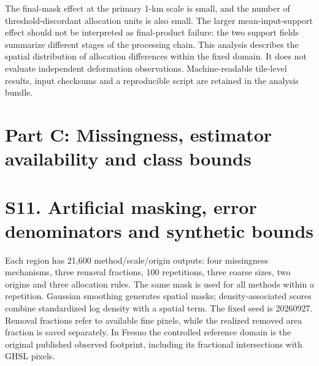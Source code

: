 \documentclass[10pt,a4paper]{article}
\begin{document}
The final-mask effect at the primary 1-km scale is small, and the number of threshold-discordant allocation units is also small. The larger mean-input-support effect should not be interpreted as final-product failure: the two support fields summarize different stages of the processing chain. This analysis describes the spatial distribution of allocation differences within the fixed domain. It does not evaluate independent deformation observations. Machine-readable tile-level results, input checksums and a reproducible script are retained in the analysis bundle.





\section*{Part C: Missingness, estimator availability and class bounds}
\section*{S11. Artificial masking, error denominators and synthetic bounds}
Each region has 21,600 method/scale/origin outputs: four missingness mechanisms, three removal fractions, 100 repetitions, three coarse sizes, two origins and three allocation rules. The same mask is used for all methods within a repetition. Gaussian smoothing generates spatial masks; density-associated scores combine standardized log density with a spatial term. The fixed seed is 20260927. Removal fractions refer to available fine pixels, while the realized removed area fraction is saved separately. In Fresno the controlled reference domain is the original published observed footprint, including its fractional intersections with GHSL pixels.
\end{document}

